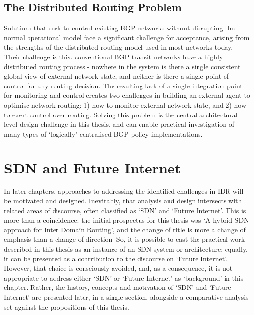 \subsection{The Distributed Routing Problem}
Solutions that seek to control existing BGP networks without disrupting the normal operational model face a significant challenge for acceptance, arising from the strengths of the distributed routing model used in most networks today.
Their challenge is this: conventional BGP transit networks have a highly distributed routing process - nowhere in the system is there a single consistent global view of external network state, and neither is there a single point of control for any routing decision.
The resulting lack of a single integration point for monitoring and control creates two challenges in building an external agent to optimise network routing: 1) how to monitor external network state, and 2) how to exert control over routing.
Solving this problem is the central architectural level design challenge in this thesis, and can enable practical investigation of many types of `logically' centralised BGP policy implementations.

\section{SDN and Future Internet}

In later chapters, approaches to addressing the identified challenges in IDR will be motivated and designed.
Inevitably, that analysis and design  intersects with related areas of discourse, often classified as `SDN' and `Future Internet'.
This is more than a coincidence: the initial prospectus for this thesis was `A hybrid SDN approach for Inter Domain Routing', and the change of title is more a change of emphasis than a change of direction.
So, it is possible to cast the practical work described in this thesis as an instance of an SDN system or architecture; equally, it can be presented as a contribution to the discourse on `Future Internet'.
However, that choice is consciously avoided, and, as a consequence, it is not appropriate to address either `SDN' or `Future Internet' as `background' in this chapter.
Rather, the history, concepts and motivation of `SDN' and `Future Internet' are presented later, in a single section, alongside a comparative analysis set against the propositions of this thesis.



